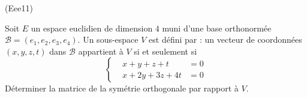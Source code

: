 \begin{tiny}(Eee11)\end{tiny} Soit $E$ un espace euclidien de dimension $4$ muni d'une base orthonormée $\mathcal{B}=(e_1,e_2,e_3,e_4)$. Un sous-espace $V$ est défini par : un vecteur de coordonnées $(x,y,z,t)$ dans $\mathcal{B}$ appartient à $V$ si et seulement si
\begin{displaymath}
 \left\lbrace 
\begin{aligned}
 &x  + y + z + t &= 0\\ & x + 2y + 3z + 4t &=0
\end{aligned}
\right. 
\end{displaymath}
Déterminer la matrice de la symétrie orthogonale par rapport à $V$. 